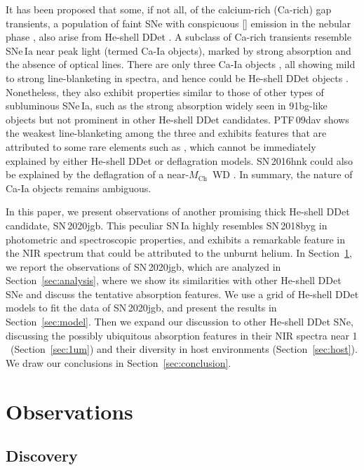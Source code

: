 \documentclass[twocolumn]{aastex631}
\newcommand{\sn}{SN\,2020jgb}
\newcommand{\Mch}{$M_\mathrm{Ch}$}
\begin{document}
It has been proposed that some, if not all, of the calcium-rich (Ca-rich) gap transients, a population of faint SNe with conspicuous [] emission in the nebular phase \citep{Filippenko_2003}, also arise from He-shell DDet \citep{Dessart_2015,de_Ca_rich_2020,polin_nebular_2021}. A subclass of Ca-rich transients resemble SNe\,Ia near peak light (termed Ca-Ia objects), marked by strong  absorption and the absence of optical  lines. There are only three Ca-Ia objects \citep[PTF\,09dav, SN\,2016hnk, and SN\,2019ofm;][]{de_Ca_rich_2020}, all showing mild to strong line-blanketing in spectra, and hence could be He-shell DDet objects \citep[e.g.,][]{jacobson-galan_16hnk_2020}. Nonetheless, they also exhibit properties similar to those of other types of subluminous SNe\,Ia, such as the strong  absorption widely seen in 91bg-like objects \citep{Filippenko_91bg_1992} but not prominent in other He-shell DDet candidates. PTF\,09dav shows the weakest line-blanketing among the three and exhibits features that are attributed to some rare elements such as  \citep{Sullivan_2011}, which cannot be immediately explained by either He-shell DDet or deflagration models. SN\,2016hnk could also be explained by the deflagration of a near-\Mch\ WD \citep{galbany_16hnk_2019}. In summary, the nature of Ca-Ia objects remains ambiguous.

In this paper, we present observations of another promising thick He-shell DDet candidate, \sn. This peculiar SN\,Ia highly resembles SN\,2018byg in photometric and spectroscopic properties, and exhibits a remarkable feature in the NIR spectrum that could be attributed to the unburnt helium. In Section~\ref{sec:obs}, we report the observations of \sn, which are analyzed in Section~\ref{sec:analysis}, where we show its similarities with other He-shell DDet SNe and discuss the tentative  absorption features. We use a grid of He-shell DDet models to fit the data of \sn, and present the results in Section~\ref{sec:model}. Then we expand our discussion to other He-shell DDet SNe, discussing the possibly ubiquitous absorption features in their NIR spectra near 1\,\micron\ (Section~\ref{sec:1um}) and their diversity in host environments (Section~\ref{sec:host}). We draw our conclusions in Section~\ref{sec:conclusion}.

\section{Observations} \label{sec:obs}
\subsection{Discovery}
\end{document}
